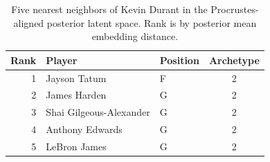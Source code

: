 \begin{table}[htbp]
  \centering\small
  \begin{tabular}{rllc}
    \toprule
    Rank & Player & Position & Archetype \\
    \midrule
    1 & Jayson Tatum & F & 2 \\
    2 & James Harden & G & 2 \\
    3 & Shai Gilgeous-Alexander & G & 2 \\
    4 & Anthony Edwards & G & 2 \\
    5 & LeBron James & G & 2 \\
    \bottomrule
  \end{tabular}
  \caption{Five nearest neighbors of Kevin Durant in the Procrustes-aligned posterior latent space. Rank is by posterior mean embedding distance.}
  \label{tab:Kevin_Durant_neighbors}
\end{table}

